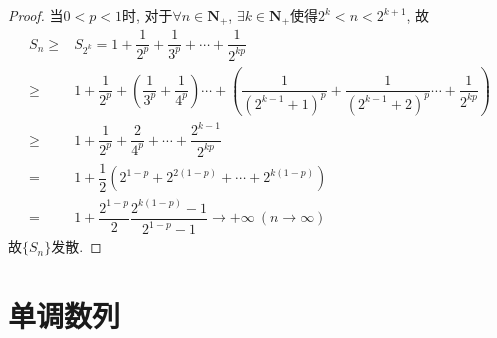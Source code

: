 \documentclass[a4paper,11pt,twoside]{ctexbook}
\begin{document}
\begin{enumerate}
\begin{proof}
		      当$0<p<1$时, 对于$\forall n\in\mathbf{N}_{+}$, $\exists k\in\mathbf{N}_{+}$使得$2^k<n<2^{k+1}$, 故
		      \begin{equation*}
			      \begin{split}
				      S_n\geqslant & S_{2^k}=1+\dfrac{1}{2^p}+\dfrac{1}{3^p}+\cdots+\dfrac{1}{2^{kp}}                                                                                         \\
				      \geqslant        & 1+\dfrac{1}{2^p}+\left(\dfrac{1}{3^p}+\dfrac{1}{4^p}\right)\cdots+\left(\dfrac{1}{(2^{k-1}+1)^p}+\dfrac{1}{(2^{k-1}+2)^p}\cdots+\dfrac{1}{2^{kp}}\right) \\
				      \geqslant        & 1+\dfrac{1}{2^p}+\dfrac{2}{4^p}+\cdots+\dfrac{2^{k-1}}{2^{kp}}                                                                                           \\
				      =                & 1+\dfrac{1}{2}(2^{1-p}+2^{2(1-p)}+\cdots+2^{k(1-p)})                                                                                                     \\
				      =                & 1+\dfrac{2^{1-p}}{2}\dfrac{2^{k(1-p)}-1}{2^{1-p}-1}\to+\infty\ (n\to\infty)
			      \end{split}
		      \end{equation*}
		      故$\{S_n\}$发散.\qedhere
	      \end{proof}
\end{enumerate}

\section{单调数列}
\end{document}
